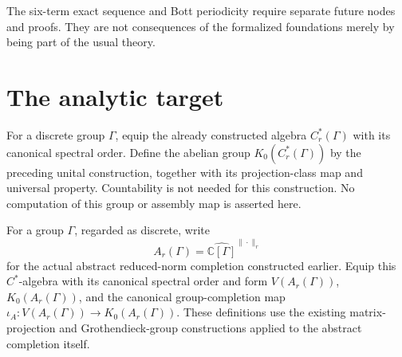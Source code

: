 The six-term exact sequence and Bott periodicity require separate future
nodes and proofs. They are not consequences of the formalized foundations
merely by being part of the usual theory.

\section{The analytic target}

\begin{definition}\label{def:analytic-k0}
\leanok
For a discrete group $\Gamma$, equip the already constructed algebra
$C_r^*(\Gamma)$ with its canonical spectral order. Define the abelian group
$K_0(C_r^*(\Gamma))$ by the preceding unital construction, together with
its projection-class map and universal property. Countability is not needed
for this construction. No computation of this group or assembly map is
asserted here.
\end{definition}


\begin{definition}\label{def:abstract-analytic-k0}
\leanok
For a group $\Gamma$, regarded as discrete, write
\[
 A_r(\Gamma)=\widehat{\mathbb C[\Gamma]}^{\|\cdot\|_r}
\]
for the actual abstract reduced-norm completion constructed earlier.
Equip this $C^*$-algebra with its canonical spectral order and form
$V(A_r(\Gamma))$, $K_0(A_r(\Gamma))$, and the canonical group-completion
map $\iota_A:V(A_r(\Gamma))\to K_0(A_r(\Gamma))$.
These definitions use the existing matrix-projection and Grothendieck-group
constructions applied to the abstract completion itself.
\end{definition}

